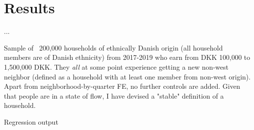 \documentclass[../main.tex]{subfiles}
\begin{document}
\section{Results}
\label{sec:results}

...

Sample of ~200,000 households of ethnically Danish origin (all household members are of Danish ethnicity) from 2017-2019 who earn from DKK 100,000 to 1,500,000 DKK. They \textit{all} at some point experience getting a new non-west neighbor (defined as a household with at least one member from non-west origin). Apart from neighborhood-by-quarter FE, no further controls are added. Given that people are in a state of flow, I have devised a "stable" definition of a household.




\begin{table}[H]
    \caption{Regression output}
    \centering
    \resizebox{0.8\textwidth}{!}{}
    \label{tab:my_label}
\end{table}
\end{document}
